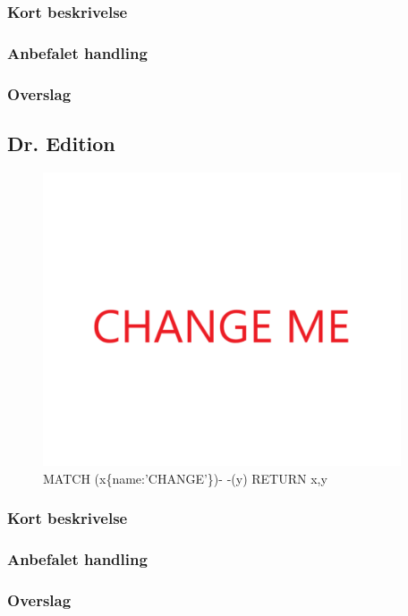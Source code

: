 \documentclass{article}
\begin{document}
\subsubsection{Kort beskrivelse}
\subsubsection{Anbefalet handling}
\subsubsection{Overslag}


\subsection{Dr. Edition}
\begin{figure}[h]
\includegraphics[width=300pt]{CHANGE.PNG}
\caption{MATCH (x\{name:'CHANGE'\})- -(y) RETURN x,y}
\end{figure}
\subsubsection{Kort beskrivelse}
\subsubsection{Anbefalet handling}
\subsubsection{Overslag}
\end{document}

